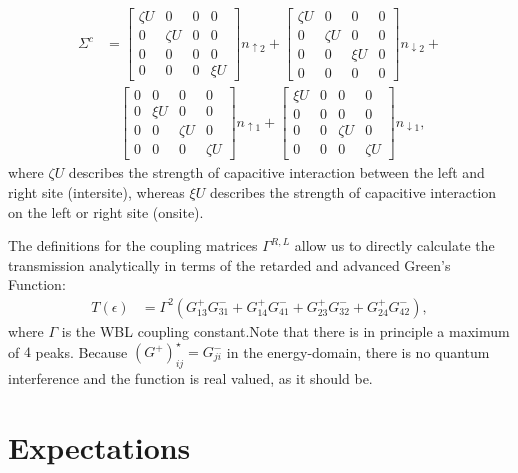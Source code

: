 \begin{align*}
\Sigma^c &= \begin{bmatrix} \zeta U & 0 & 0 & 0\\ 0 & \zeta U & 0 & 0\\ 0 & 0 & 0 & 0\\ 0 & 0 & 0 & \xi U \end{bmatrix} n_{\uparrow 2} + \begin{bmatrix} \zeta U & 0 & 0 & 0\\ 0 & \zeta U & 0 & 0\\ 0 & 0 & \xi U & 0\\ 0 & 0 & 0 & 0 \end{bmatrix} n_{\downarrow 2} +\\
&\quad\begin{bmatrix} 0 & 0 & 0 & 0\\ 0 & \xi  U & 0 & 0\\ 0 & 0 & \zeta U & 0\\ 0 & 0 & 0 & \zeta U \end{bmatrix} n_{\uparrow 1} + \begin{bmatrix} \xi  U & 0 & 0 & 0\\ 0 & 0 & 0 & 0\\ 0 & 0 & \zeta U & 0\\ 0 & 0 & 0 & \zeta U \end{bmatrix} n_{\downarrow 1},
\end{align*}
where $\zeta U$ describes the strength of capacitive interaction between the left and right site (intersite), whereas $\xi U$ describes the strength of capacitive interaction on the left or right site (onsite).

The definitions for the coupling matrices $\Gamma^{R,L}$ allow us to directly calculate the transmission analytically in terms of the retarded and advanced Green's Function:
\begin{align*}
T(\epsilon) &= \Gamma^2 \left( G^+_{13} G^-_{31} + G^+_{14} G^-_{41} + G^+_{23} G^-_{32} + G^+_{24} G^-_{42} \right),
\end{align*}
where $\Gamma$ is the WBL coupling constant.Note that there is in principle a maximum of $4$ peaks. Because $\left(G^+\right)_{ij}^\star = G^-_{ji}$ in the energy-domain, there is no quantum interference and the function is real valued, as it should be.

\section{Expectations}
\label{sec:expectations}
